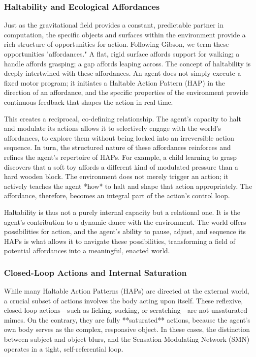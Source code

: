 \subsubsection{Haltability and Ecological Affordances}
\label{ssubsec:affordances}
Just as the gravitational field provides a constant, predictable partner in computation, the specific objects and surfaces within the environment provide a rich structure of opportunities for action. Following Gibson, we term these opportunities "affordances." A flat, rigid surface affords support for walking; a handle affords grasping; a gap affords leaping across. The concept of haltability is deeply intertwined with these affordances. An agent does not simply execute a fixed motor program; it initiates a Haltable Action Pattern (HAP) in the direction of an affordance, and the specific properties of the environment provide continuous feedback that shapes the action in real-time.

This creates a reciprocal, co-defining relationship. The agent’s capacity to halt and modulate its actions allows it to selectively engage with the world’s affordances, to explore them without being locked into an irreversible action sequence. In turn, the structured nature of these affordances reinforces and refines the agent’s repertoire of HAPs. For example, a child learning to grasp discovers that a soft toy affords a different kind of modulated pressure than a hard wooden block. The environment does not merely trigger an action; it actively teaches the agent *how* to halt and shape that action appropriately. The affordance, therefore, becomes an integral part of the action's control loop.

Haltability is thus not a purely internal capacity but a relational one. It is the agent's contribution to a dynamic dance with the environment. The world offers possibilities for action, and the agent's ability to pause, adjust, and sequence its HAPs is what allows it to navigate these possibilities, transforming a field of potential affordances into a meaningful, enacted world.

\subsubsection{Closed-Loop Actions and Internal Saturation}
\label{ssubsec:closed_loop}
While many Haltable Action Patterns (HAPs) are directed at the external world, a crucial subset of actions involves the body acting upon itself. These reflexive, closed-loop actions—such as licking, sucking, or scratching—are not unsaturated mimes. On the contrary, they are fully **saturated** actions, because the agent's own body serves as the complex, responsive object. In these cases, the distinction between subject and object blurs, and the Sensation-Modulating Network (SMN) operates in a tight, self-referential loop.

